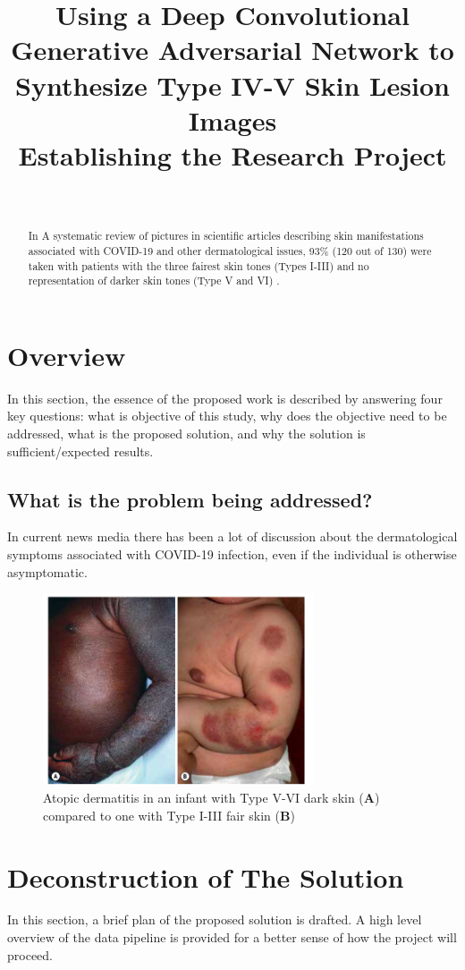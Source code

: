 \documentclass{IEEEtran}
\title{\LARGE Using a Deep Convolutional Generative Adversarial Network to Synthesize Type IV-V Skin Lesion Images
    \\
    \large Establishing the Research Project}
\author{
\IEEEauthorblockN{Muhammad Umar Ali} \\
\IEEEauthorblockA{\textit{School of Biomedical Engineering} \\
\textit{University of British Columbia} \\
umaruali@student.ubc.ca}
}
\begin{document}
    \maketitle
    \begin{abstract}
        In A systematic review of pictures in scientific articles describing skin manifestations associated with COVID-19 and other dermatological issues, 93\% (120 out of 130) were taken with patients with the three fairest skin tones (Types I-III) and no representation of darker skin tones (Type V and VI) \cite{lester}.
    \end{abstract}

    \section{Overview}
    { In this section, the essence of the proposed work is described by answering four key questions: what is objective of this study, why does the objective need to be addressed, what is the proposed solution, and why the solution is sufficient/expected results.}

    \subsection{What is the problem being addressed?}
    {In current news media there has been a lot of discussion about the dermatological symptoms associated with COVID-19 infection, even if the individual is otherwise asymptomatic. }
    \begin{figure}[htbp]
        \centering
        \includegraphics[width=8cm]{figure1}
        \caption{Atopic dermatitis in an infant with Type V-VI dark skin (\textbf{A}) compared to one with Type I-III fair skin (\textbf{B}) \cite{bolognia}}
    \end{figure}


\section{Deconstruction of The Solution}
{In this section, a brief plan of the proposed solution is drafted. A high level overview of the data pipeline is provided for a better sense of how the project will proceed.}
\end{document}
